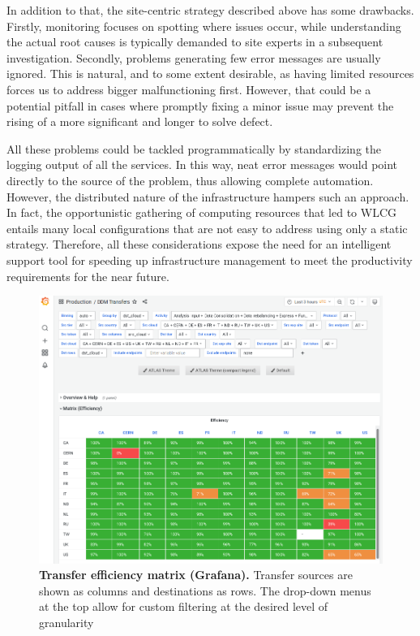 In addition to that, the site-centric strategy described above has some drawbacks. Firstly, monitoring focuses on spotting where issues occur, while understanding the actual root causes is typically demanded to site experts in a subsequent investigation.
Secondly, problems generating few error messages are usually ignored. This is natural, and to some extent desirable, as having limited resources forces us to address bigger malfunctioning first. However, that could be a potential pitfall in cases where promptly fixing a minor issue may prevent the rising of a more significant and longer to solve defect.

All these problems could be tackled programmatically by standardizing the logging output of all the services. In this way, neat error messages would point directly to the source of the problem, thus allowing complete automation. 
However, the distributed nature of the infrastructure hampers such an approach.
In fact, the opportunistic gathering of computing resources that led to WLCG entails many local configurations that are not easy to address using only a static strategy.
Therefore, all these considerations expose the need for an intelligent support tool for speeding up infrastructure management to meet the productivity requirements for the near future.

\begin{landscape}
\begin{figure}
    \centering
    \includegraphics[height=\textwidth]{figures/220_introduction/grafana_efficiency_matrix_narrow1.png}
    \caption{\textbf{Transfer efficiency matrix (Grafana).} Transfer sources are shown as columns and destinations as rows. The drop-down menus at the top allow for custom filtering at the desired level of granularity}
    \label{fig:efficiency_matrix}
\end{figure}
\end{landscape}